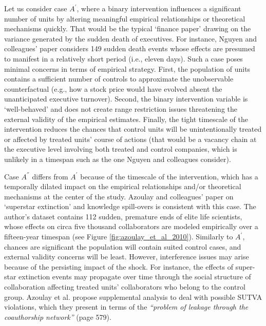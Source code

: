 \documentclass[11pt]{article}
\begin{document}
\begin{refsection}
Let us consider case $A^{'}$, where a binary intervention influences a significant number of units by altering meaningful empirical relationships or theoretical mechanisms quickly. That would be the typical `finance paper' drawing on the variance generated by the sudden death of executives. For instance, Nguyen and colleagues' \autocite*{nguyen_et_al_2014} paper considers 149 sudden death events whose effects are presumed to manifest in a relatively short period (i.e., eleven days). Such a case poses minimal concerns in terms of empirical strategy.  First, the population of units contains a sufficient number of controls to approximate the unobservable counterfactual (e.g., how a stock price would have evolved absent the unanticipated executive turnover). Second, the binary intervention variable is `well-behaved' and does not create range restriction issues threatening the external validity of the empirical estimates.  Finally, the tight timescale of the intervention reduces the chances that control units will be unintentionally treated or affected by treated units' course of actions (that would be a vacancy chain at the executive level involving both treated and control companies, which is unlikely in a timespan such as the one Nguyen and colleagues \autocite*{nguyen_et_al_2014} consider).  

Case $A^{''}$ differs from $A^{'}$ because of the timescale of the intervention, which has a temporally dilated impact on the empirical relationships and/or theoretical mechanisms at the center of the study. Azoulay and colleagues' \autocite*{azoulay_et_al_2010} paper on `superstar extinction' and knowledge spill-overs is consistent with this case. The author's dataset contains 112 sudden, premature ends of elite life scientists, whose effects on circa five thousand collaborators are modeled empirically over a fifteen-year timespan (see Figure \ref{fig:azoulay_et_al_2010}). Similarly to $A^{'}$, chances are significant the population will contain suited control cases, and external validity concerns will be least. However, interference issues may arise because of the persisting impact of the shock.  For instance, the effects of super-star extinction events may propagate over time through the social structure of collaboration affecting treated units' collaborators who belong to the control group. Azoulay et al.  \autocite*{azoulay_et_al_2010} propose supplemental analysis to deal with possible SUTVA violations, which they present in terms of the \textit{``problem of leakage through the coauthorship network''} (page 579).


\end{refsection}
\end{document}
